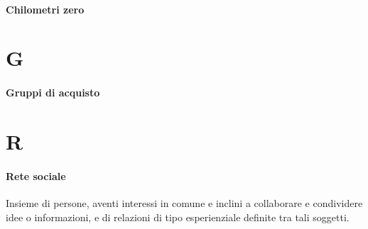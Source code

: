 \documentclass[12pt,a4paper,headsepline,hidelinks]{scrreprt} %
\begin{document}
	\paragraph{Chilometri zero}
	\section*{G}
	\paragraph{Gruppi di acquisto}
	\section*{R}
	\paragraph{Rete sociale}
	Insieme di persone, aventi interessi in comune e inclini a collaborare e condividere idee o informazioni, e di relazioni di tipo esperienziale definite tra tali soggetti.
\end{document}
